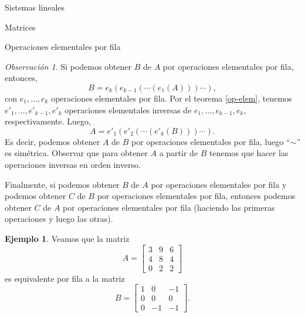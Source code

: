 \documentclass[a4paper,12pt,twoside,spanish,reqno]{amsbook}
\theoremstyle{definition}
\newtheorem{ejemplo}{Ejemplo}[section]
\theoremstyle{remark}
\newtheorem{obs}{Observaci\'on}[section]
\begin{document}
\begin{chapter}{Sistemas lineales}
\begin{section}{Matrices}
\begin{subsection}{Operaciones elementales por fila}
\begin{obs}
                    Si podemos obtener $B$ de $A$ por operaciones elementales por fila, entonces, 
                    $$
                    B = e_k(e_{k-1}(\cdots(e_1(A)))\cdots),
                    $$
                    con $e_1,\ldots,e_k$ operaciones elementales por fila. Por el teorema \ref{op-elem},  tenemos $e'_1,\ldots,e'_{k-1},e'_k$ operaciones elementales inversas de  $e_1,\ldots,e_{k-1},e_k$, respectivamente. Luego, 
                    $$
                    A = e'_1(e'_{2}(\cdots(e'_k(B)))\cdots).
                    $$
                    Es decir, podemos  obtener $A$ de $B$ por operaciones elementales por fila, luego ``$\sim$'' es simétrica. Observar que para obtener $A$ a partir de $B$ tenemos que hacer las operaciones inversas en orden inverso. 
                    
                    Finalmente,   si podemos obtener $B$ de $A$ por operaciones elementales por fila y  podemos obtener $C$ de $B$ por operaciones elementales por fila, entonces podemos obtener $C$ de $A$ por operaciones elementales por fila (haciendo las primeras operaciones y luego las otras).
                \end{obs}
                
                \begin{ejemplo}
                    Veamos que la matriz 
                    \begin{equation*}
                    A= 	\begin{bmatrix}
                    3 & 9 & 6 \\ 4&8&4 \\ 0&2&2
                    \end{bmatrix}
                    \end{equation*}
                    es equivalente por fila a la matriz
                    \begin{equation*}
                    B = \begin{bmatrix}
                    1&0&-1 \\ 0&0&0\\  0&-1&-1
                    \end{bmatrix}.
                    \end{equation*}
                        \end{ejemplo}
                    

\end{subsection}
\end{section}
\end{chapter}
\end{document}
